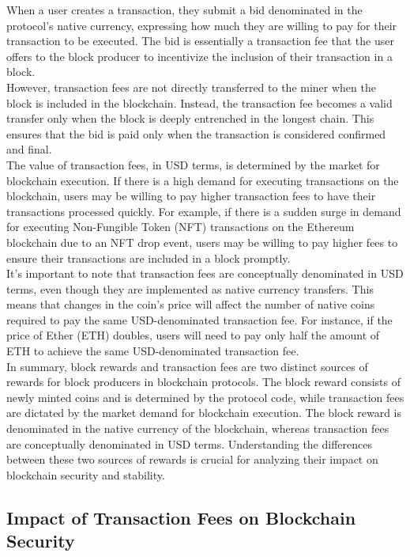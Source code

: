 When a user creates a transaction, they submit a bid denominated in the protocol's native currency, expressing how much they are willing to pay for their transaction to be executed. The bid is essentially a transaction fee that the user offers to the block producer to incentivize the inclusion of their transaction in a block.\\
However, transaction fees are not directly transferred to the miner when the block is included in the blockchain. Instead, the transaction fee becomes a valid transfer only when the block is deeply entrenched in the longest chain. This ensures that the bid is paid only when the transaction is considered confirmed and final.\\
The value of transaction fees, in USD terms, is determined by the market for blockchain execution. If there is a high demand for executing transactions on the blockchain, users may be willing to pay higher transaction fees to have their transactions processed quickly. For example, if there is a sudden surge in demand for executing Non-Fungible Token (NFT) transactions on the Ethereum blockchain due to an NFT drop event, users may be willing to pay higher fees to ensure their transactions are included in a block promptly.\\
It's important to note that transaction fees are conceptually denominated in USD terms, even though they are implemented as native currency transfers. This means that changes in the coin's price will affect the number of native coins required to pay the same USD-denominated transaction fee. For instance, if the price of Ether (ETH) doubles, users will need to pay only half the amount of ETH to achieve the same USD-denominated transaction fee.\\

In summary, block rewards and transaction fees are two distinct sources of rewards for block producers in blockchain protocols. The block reward consists of newly minted coins and is determined by the protocol code, while transaction fees are dictated by the market demand for blockchain execution. The block reward is denominated in the native currency of the blockchain, whereas transaction fees are conceptually denominated in USD terms. Understanding the differences between these two sources of rewards is crucial for analyzing their impact on blockchain security and stability.

\subsection{Impact of Transaction Fees on Blockchain Security}

